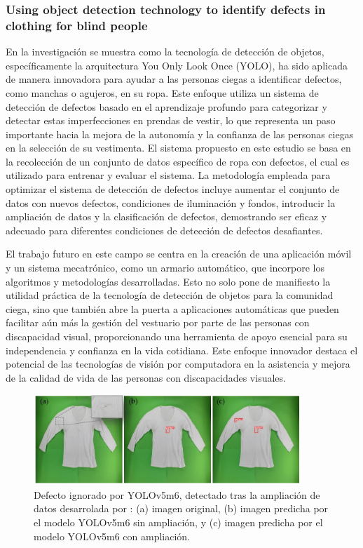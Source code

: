 \subsubsection{Using object detection technology to identify defects in clothing for blind people}

En la investigación \cite{Rocha2023} se muestra como la tecnología de detección de objetos, específicamente la arquitectura You Only Look Once (YOLO), ha sido aplicada de manera innovadora para ayudar a las personas ciegas a identificar defectos, como manchas o agujeros, en su ropa. Este enfoque utiliza un sistema de detección de defectos basado en el aprendizaje profundo para categorizar y detectar estas imperfecciones en prendas de vestir, lo que representa un paso importante hacia la mejora de la autonomía y la confianza de las personas ciegas en la selección de su vestimenta. El sistema propuesto en este estudio se basa en la recolección de un conjunto de datos específico de ropa con defectos, el cual es utilizado para entrenar y evaluar el sistema. La metodología empleada para optimizar el sistema de detección de defectos incluye aumentar el conjunto de datos con nuevos defectos, condiciones de iluminación y fondos, introducir la ampliación de datos y la clasificación de defectos, demostrando ser eficaz y adecuado para diferentes condiciones de detección de defectos desafiantes.

El trabajo futuro en este campo se centra en la creación de una aplicación móvil y un sistema mecatrónico, como un armario automático, que incorpore los algoritmos y metodologías desarrolladas. Esto no solo pone de manifiesto la utilidad práctica de la tecnología de detección de objetos para la comunidad ciega, sino que también abre la puerta a aplicaciones automáticas que pueden facilitar aún más la gestión del vestuario por parte de las personas con discapacidad visual, proporcionando una herramienta de apoyo esencial para su independencia y confianza en la vida cotidiana. Este enfoque innovador destaca el potencial de las tecnologías de visión por computadora en la asistencia y mejora de la calidad de vida de las personas con discapacidades visuales.

\begin{figure}[H]
	\centering
	\includegraphics[width=0.9\textwidth]{img/example_YOLO.pdf}
	\caption[Defecto ignorado por YOLOv5m6, detectado tras la ampliación de datos.]{Defecto ignorado por YOLOv5m6, detectado tras la ampliación de datos desarrolada por \cite{Rocha2023}: (a) imagen original, (b) imagen predicha por el modelo YOLOv5m6 sin ampliación, y (c) imagen predicha por el modelo YOLOv5m6 con ampliación.}
	\label{fig:example_YOLO}
\end{figure}

